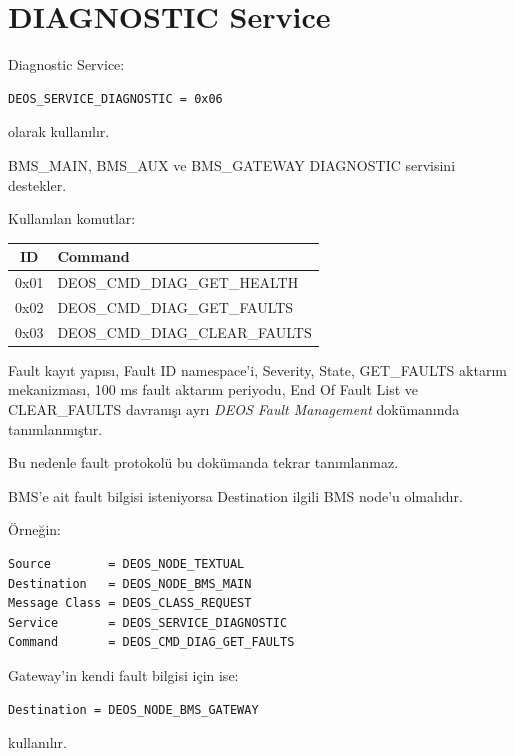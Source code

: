 \documentclass[a4paper,10pt]{article}
\begin{document}
\section{DIAGNOSTIC Service}

Diagnostic Service:

\begin{lstlisting}
DEOS_SERVICE_DIAGNOSTIC = 0x06
\end{lstlisting}

olarak kullanılır.

BMS\_MAIN, BMS\_AUX ve BMS\_GATEWAY DIAGNOSTIC servisini destekler.

Kullanılan komutlar:

\begin{center}
\begin{tabular}{c l}
\toprule
\textbf{ID} & \textbf{Command} \\
\midrule

0x01 & DEOS\_CMD\_DIAG\_GET\_HEALTH \\
0x02 & DEOS\_CMD\_DIAG\_GET\_FAULTS \\
0x03 & DEOS\_CMD\_DIAG\_CLEAR\_FAULTS \\

\bottomrule
\end{tabular}
\end{center}

Fault kayıt yapısı, Fault ID namespace'i, Severity, State,
GET\_FAULTS aktarım mekanizması, 100 ms fault aktarım periyodu,
End Of Fault List ve CLEAR\_FAULTS davranışı ayrı
\textit{DEOS Fault Management} dokümanında tanımlanmıştır.

Bu nedenle fault protokolü bu dokümanda tekrar tanımlanmaz.

BMS'e ait fault bilgisi isteniyorsa Destination ilgili BMS node'u
olmalıdır.

Örneğin:

\begin{lstlisting}
Source        = DEOS_NODE_TEXTUAL
Destination   = DEOS_NODE_BMS_MAIN
Message Class = DEOS_CLASS_REQUEST
Service       = DEOS_SERVICE_DIAGNOSTIC
Command       = DEOS_CMD_DIAG_GET_FAULTS
\end{lstlisting}

Gateway'in kendi fault bilgisi için ise:

\begin{lstlisting}
Destination = DEOS_NODE_BMS_GATEWAY
\end{lstlisting}

kullanılır.
\end{document}
